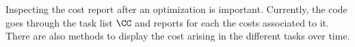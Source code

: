\documentclass[10pt,fleqn,twoside]{article}
\begin{document}
{{Inspecting the cost report after an optimization is
important. Currently, the code goes through the task list $\CC$ and
reports for each the costs associated to it. There are also methods to
display the cost arising in the different tasks over time.













}}
\end{document}
